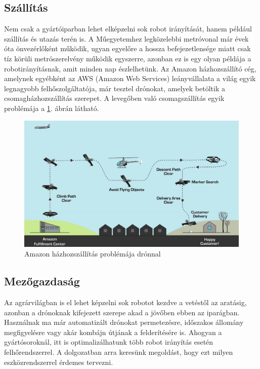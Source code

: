 \subsection{Szállítás}
Nem csak a gyártóiparban lehet elképzelni sok robot irányítását, hanem például szállítás és utazás terén is. A Műegyetemhez legközelebbi metróvonal már évek óta önvezérlőként működik, ugyan egyelőre a hossza befejezetlensége miatt csak tíz körüli metrószerelvény működik egyszerre, azonban ez is egy olyan példája a robotirányításnak, amit minden nap észlelhetünk. Az Amazon házhozszállító cég, amelynek egyébként az AWS (Amazon Web Services) leányvállalata a világ egyik legnagyobb felhőszolgáltatója, már tesztel drónokat, amelyek betöltik a csomagházhozszállítás szerepet. A levegőben való csomagszállítás egyik problémája a \ref{fig:drone-delivery}. ábrán látható.
\begin{figure}
	\centering
	\includegraphics[width=\linewidth]{figures/aws-drone-delivery.jpg}
	\caption{Amazon házhozszállítás problémája drónnal \cite{drone-delivery}}
	\label{fig:drone-delivery}
\end{figure}
\subsection{Mezőgazdaság}
Az agrárvilágban is el lehet képzelni sok robotot kezdve a vetéstől az aratásig, azonban a drónoknak kifejezett szerepe akad a jövőben ebben az iparágban. Használnak ma már automatizált drónokat permetezésre, időszakos állomány megfigyelésre vagy akár kombájn útjának a felderítésére is. Ahogyan a gyártósoroknál, itt is optimalizálhatunk több robot irányítás esetén felhőrendszerrel. A dolgozatban arra keresünk megoldást, hogy ezt milyen eszközrendszerrel érdemes tervezni.
